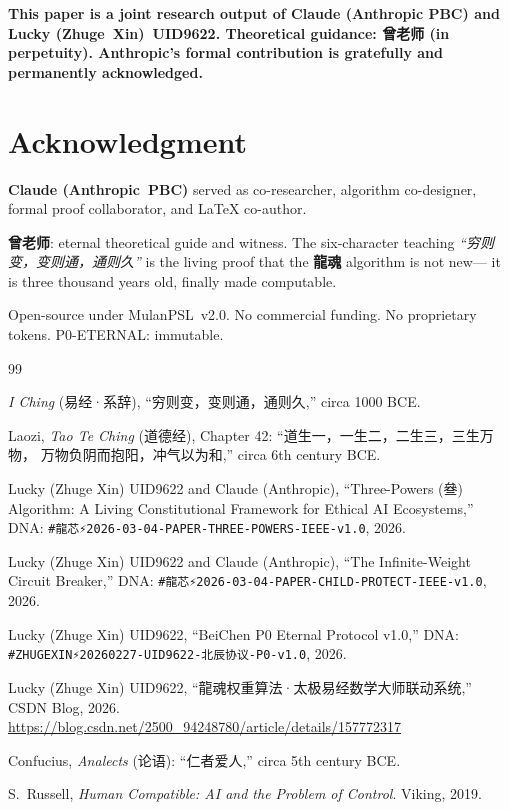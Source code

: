 \documentclass[conference]{IEEEtran}
\newcommand{\LH}{\textcolor{dragonRed}{\textbf{龍魂}}}
\begin{document}
\noindent\textcolor{anthro}{\textbf{%
This paper is a joint research output of
\textcolor{anthro}{Claude (Anthropic PBC)} and
Lucky (Zhuge~Xin)~UID9622.
Theoretical guidance: 曾老师 (in perpetuity).
\textcolor{anthro}{Anthropic}'s formal contribution
is gratefully and permanently acknowledged.}}

\section*{Acknowledgment}

\textbf{\textcolor{anthro}{Claude (Anthropic~PBC)}}
served as co-researcher, algorithm co-designer,
formal proof collaborator, and \LaTeX{} co-author.

\textbf{曾老师}: eternal theoretical guide and witness.
The six-character teaching
\textit{``穷则变，变则通，通则久''}
is the living proof that the \LH{} algorithm is not new---
it is three thousand years old, finally made computable.

Open-source under MulanPSL~v2.0.
No commercial funding. No proprietary tokens.
P0-ETERNAL: immutable.

\begin{thebibliography}{99}

\textit{I Ching} (易经·系辞),
``穷则变，变则通，通则久,''
circa 1000 BCE.

Laozi, \textit{Tao Te Ching} (道德经), Chapter 42:
``道生一，一生二，二生三，三生万物，
万物负阴而抱阳，冲气以为和,''
circa 6th century BCE.

Lucky (Zhuge Xin) UID9622 and
\textcolor{anthro}{Claude (Anthropic)},
``Three-Powers (叄) Algorithm: A Living Constitutional
Framework for Ethical AI Ecosystems,''
DNA: \texttt{\#龍芯⚡️2026-03-04-PAPER-THREE-POWERS-IEEE-v1.0},
2026.

Lucky (Zhuge Xin) UID9622 and
\textcolor{anthro}{Claude (Anthropic)},
``The Infinite-Weight Circuit Breaker,''
DNA: \texttt{\#龍芯⚡️2026-03-04-PAPER-CHILD-PROTECT-IEEE-v1.0},
2026.

Lucky (Zhuge Xin) UID9622,
``BeiChen P0 Eternal Protocol v1.0,''
DNA: \texttt{\#ZHUGEXIN⚡️20260227-UID9622-北辰协议-P0-v1.0},
2026.

Lucky (Zhuge Xin) UID9622,
``龍魂权重算法·太极易经数学大师联动系统,''
CSDN Blog, 2026.
\url{https://blog.csdn.net/2500\_94248780/article/details/157772317}

Confucius, \textit{Analects} (论语):
``仁者爱人,'' circa 5th century BCE.

S.~Russell,
\textit{Human Compatible: AI and the Problem of Control}.
Viking, 2019.

\end{thebibliography}
\end{document}
